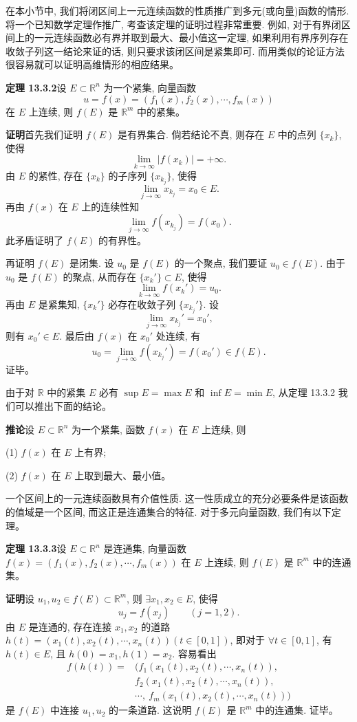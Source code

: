 \documentclass[UTF8, 12pt, fontset=fandol, oneside]{ctexart}
\begin{document}
在本小节中, 我们将闭区间上一元连续函数的性质推广到多元(或向量)函数的情形. 将一个已知数学定理作推广, 考查该定理的证明过程非常重要. 例如, 对于有界闭区间上的一元连续函数必有界并取到最大、最小值这一定理, 如果利用有界序列存在收敛子列这一结论来证的话, 则只要求该闭区间是紧集即可. 而用类似的论证方法很容易就可以证明高维情形的相应结果。

\noindent\textbf{定理 13.3.2}\quad 设 $E\subset\mathbb R^n$ 为一个紧集, 向量函数
\[
  u=f(x)=(f_1(x),f_2(x),\cdots,f_m(x))
\]
在 $E$ 上连续, 则 $f(E)$ 是 $\mathbb R^m$ 中的紧集。

\noindent\textbf{证明}\quad 首先我们证明 $f(E)$ 是有界集合. 倘若结论不真, 则存在 $E$ 中的点列 $\{x_k\}$, 使得
\[
  \lim_{k\to\infty}|f(x_k)|=+\infty.
\]
由 $E$ 的紧性, 存在 $\{x_k\}$ 的子序列 $\{x_{k_j}\}$, 使得
\[
  \lim_{j\to\infty}x_{k_j}=x_0\in E.
\]
再由 $f(x)$ 在 $E$ 上的连续性知
\[
  \lim_{j\to\infty}f(x_{k_j})=f(x_0).
\]
此矛盾证明了 $f(E)$ 的有界性。

再证明 $f(E)$ 是闭集. 设 $u_0$ 是 $f(E)$ 的一个聚点, 我们要证 $u_0\in f(E)$. 由于 $u_0$ 是 $f(E)$ 的聚点, 从而存在 $\{x_k'\}\subset E$, 使得
\[
  \lim_{k\to\infty}f(x_k')=u_0.
\]
再由 $E$ 是紧集知, $\{x_k'\}$ 必存在收敛子列 $\{x_{k_j}'\}$. 设
\[
  \lim_{j\to\infty}x_{k_j}'=x_0',
\]
则有 $x_0'\in E$. 最后由 $f(x)$ 在 $x_0'$ 处连续, 有
\[
  u_0=\lim_{j\to\infty}f(x_{k_j}')=f(x_0')\in f(E).
\]
证毕。

由于对 $\mathbb R$ 中的紧集 $E$ 必有 $\sup E=\max E$ 和 $\inf E=\min E$, 从定理 13.3.2 我们可以推出下面的结论。

\noindent\textbf{推论}\quad 设 $E\subset\mathbb R^n$ 为一个紧集, 函数 $f(x)$ 在 $E$ 上连续, 则

(1) $f(x)$ 在 $E$ 上有界;

(2) $f(x)$ 在 $E$ 上取到最大、最小值。

一个区间上的一元连续函数具有介值性质. 这一性质成立的充分必要条件是该函数的值域是一个区间, 而这正是连通集合的特征. 对于多元向量函数, 我们有以下定理。

\noindent\textbf{定理 13.3.3}\quad 设 $E\subset\mathbb R^n$ 是连通集, 向量函数 $f(x)=(f_1(x),f_2(x),\cdots,f_m(x))$ 在 $E$ 上连续, 则 $f(E)$ 是 $\mathbb R^m$ 中的连通集。

\noindent\textbf{证明}\quad 设 $u_1,u_2\in f(E)\subset\mathbb R^m$, 则 $\exists x_1,x_2\in E$, 使得
\[
  u_j=f(x_j)\qquad (j=1,2).
\]
由 $E$ 是连通的, 存在连接 $x_1,x_2$ 的道路 $h(t)=(x_1(t),x_2(t),\cdots,x_n(t))(t\in[0,1])$, 即对于 $\forall t\in[0,1]$, 有 $h(t)\in E$, 且 $h(0)=x_1,h(1)=x_2$. 容易看出
\[
\begin{aligned}
  f(h(t))={}&(f_1(x_1(t),x_2(t),\cdots,x_n(t)),\\
  &f_2(x_1(t),x_2(t),\cdots,x_n(t)),\\
  &\cdots,\ f_m(x_1(t),x_2(t),\cdots,x_n(t)))
\end{aligned}
\]
是 $f(E)$ 中连接 $u_1,u_2$ 的一条道路. 这说明 $f(E)$ 是 $\mathbb R^m$ 中的连通集. 证毕。
\end{document}
